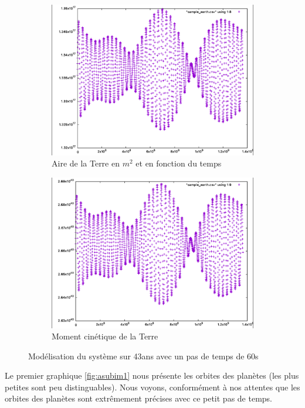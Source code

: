 \documentclass[11pt]{article}
\begin{document}
\begin{figure}[H]
\begin{subfigure}{0.5\textwidth}
\includegraphics[width=1\linewidth]{43y area earth.png}
\caption{Aire de la Terre en \(m^2\) et en fonction du temps}
\label{fig:csubim3}
\end{subfigure}
\begin{subfigure}{0.5\textwidth}
\includegraphics[width=1\linewidth]{43y cinematic moment earth.png}
\caption{Moment cinétique de la Terre}
\label{fig:dsubim4}
\end{subfigure}
\caption{Modélisation du système sur 43ans avec un pas de temps de 60s}
\label{fig:image2}
\end{figure}

Le premier graphique \ref{fig:asubim1} nous présente les orbites des planètes (les plus petites sont peu distinguables). Nous voyons, conformément à nos attentes que les orbites des planètes sont extrêmement précises avec ce petit pas de temps.
\end{document}
